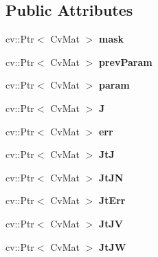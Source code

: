 \subsection*{Public Attributes}
\begin{DoxyCompactItemize}
\item 
\hypertarget{classLevMarq_aecf74aea14045cfe1f6f72e857fe6c2c}{cv\-::\-Ptr$<$ Cv\-Mat $>$ {\bfseries mask}}\label{classLevMarq_aecf74aea14045cfe1f6f72e857fe6c2c}

\item 
\hypertarget{classLevMarq_af46d799bda945c496c44c11cf1fa5998}{cv\-::\-Ptr$<$ Cv\-Mat $>$ {\bfseries prev\-Param}}\label{classLevMarq_af46d799bda945c496c44c11cf1fa5998}

\item 
\hypertarget{classLevMarq_a7728fec5d3f0d5cdc5ddafb267c41fca}{cv\-::\-Ptr$<$ Cv\-Mat $>$ {\bfseries param}}\label{classLevMarq_a7728fec5d3f0d5cdc5ddafb267c41fca}

\item 
\hypertarget{classLevMarq_a18acce9e7d1c4347fe46d8bd311072c4}{cv\-::\-Ptr$<$ Cv\-Mat $>$ {\bfseries J}}\label{classLevMarq_a18acce9e7d1c4347fe46d8bd311072c4}

\item 
\hypertarget{classLevMarq_a1da29ce46ef7ad8968452d3635714fba}{cv\-::\-Ptr$<$ Cv\-Mat $>$ {\bfseries err}}\label{classLevMarq_a1da29ce46ef7ad8968452d3635714fba}

\item 
\hypertarget{classLevMarq_a185126576a30353096b91aa9a4b53055}{cv\-::\-Ptr$<$ Cv\-Mat $>$ {\bfseries Jt\-J}}\label{classLevMarq_a185126576a30353096b91aa9a4b53055}

\item 
\hypertarget{classLevMarq_a3b8a32b02fb2f26a6aa70dcbf683337f}{cv\-::\-Ptr$<$ Cv\-Mat $>$ {\bfseries Jt\-J\-N}}\label{classLevMarq_a3b8a32b02fb2f26a6aa70dcbf683337f}

\item 
\hypertarget{classLevMarq_ad1354639ef42ce751ca02059366dc17d}{cv\-::\-Ptr$<$ Cv\-Mat $>$ {\bfseries Jt\-Err}}\label{classLevMarq_ad1354639ef42ce751ca02059366dc17d}

\item 
\hypertarget{classLevMarq_ade52c74834b2d02b3fe3ada9f222f39e}{cv\-::\-Ptr$<$ Cv\-Mat $>$ {\bfseries Jt\-J\-V}}\label{classLevMarq_ade52c74834b2d02b3fe3ada9f222f39e}

\item 
\hypertarget{classLevMarq_ae17c0c8c9371039ed613fc0742c3441a}{cv\-::\-Ptr$<$ Cv\-Mat $>$ {\bfseries Jt\-J\-W}}\label{classLevMarq_ae17c0c8c9371039ed613fc0742c3441a}


\end{DoxyCompactItemize}
